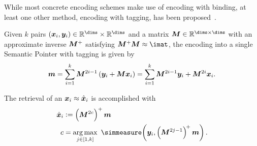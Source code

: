 While most concrete encoding schemes make use of encoding with binding, at least one other method, encoding with tagging, has been proposed~\parencite{recchia2015}.
\begin{defn}
    Given $k$ pairs $(\vc x_i, \vc y_i) \in \mathbb{R}^{\dims} \times \mathbb{R}^{\dims}$ and a matrix $\mat M \in \mathbb{R}^{\dims \times \dims}$ with an approximate inverse $\bm{M}^+$ satisfying $\mat M^+ \mat M \approx \imat$, the encoding into a single Semantic Pointer with tagging is given by
    \begin{equation}
        \vc m = \sum_{i=1}^k \mat M^{2i-1} \del{\vc y_i + \mat M \vc x_i} = \sum_{i=1}^k \mat M^{2i-1} \vc y_i + \mat M^{2i} \vc x_i \text{.}
    \end{equation}
\end{defn}
The retrieval of an $\bm{x}_i \approx \hat{\bm{x}}_i$ is accomplished with
\begin{align}
    \hat{\vc x}_i &:= \del{\mat M^{2c}}^+ \vc m \\
    c &= \argmax_{j \in \sbr{1, k}}\ \simmeasure\!\del{\vc y_i, \del{\mat M^{2j-1}}^{\!+} \vc m} \text{.}
\end{align}

